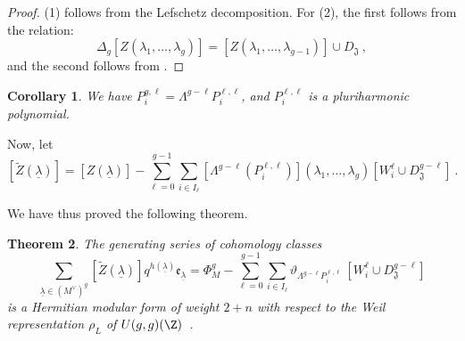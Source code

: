 \documentclass[11pt,letterpaper,english]{amsart}
\numberwithin{equation}{subsection}
\numberwithin{equation}{section}
\newcommand\cZ{{\mathcal Z}}
\newcommand\gram{{\mathrm{Gram}}}
\newcommand\fJ{{\mathfrak J}}
\theoremstyle{plain}
\newtheorem{theorem}{Theorem}[section]
\newtheorem{corollary}[theorem]{Corollary}
\theoremstyle{remark}
\begin{document}



\begin{proof}
    (1) follows from the Lefschetz decomposition. For (2), the first follows from the relation: 
    \[\Delta_g[Z(\lambda_1,\ldots,\lambda_g)]=[Z(\lambda_1,\ldots,\lambda_{g-1})]\cup D_\fJ~,\]
    and the second follows from .
\end{proof}
\begin{corollary}
    We have $P^{g,\ell}_i=\Lambda^{g-\ell}P^{\ell,\ell}_i$,
    and $P^{\ell,\ell}_i$ is a pluriharmonic polynomial.
\end{corollary}

Now, let \[[\widetilde{Z}(\underline \lambda)]=[Z(\underline\lambda)]-\sum_{\ell=0}^{g-1}\sum_{i\in I_{\ell}}[\Lambda^{g-\ell}(P_i^{\ell,\ell})](\lambda_1,\ldots,\lambda_g)[W_{i}^{\ell}\cup D_{\fJ}^{g-\ell}]~.\]


We have thus proved the following theorem.
\begin{theorem}\label{explicit-main-theorem}
    The generating series of cohomology classes
    \[\sum_{\underline \lambda\in (M^\vee)^g}[\widetilde{Z}(\underline\lambda)] q^{h(\underline{\lambda})}\mathfrak e_{\underline{\lambda}}=\Phi_M^g-\sum_{\ell=0}^{g-1}\sum_{i\in I_\ell}\vartheta_{\Lambda^{g-\ell}P^{\ell,\ell}_i}~[W^\ell_i\cup D_{\fJ}^{g-\ell}]\]
    is a Hermitian modular form of weight $2+n$ with respect to the Weil representation $\rho_L$ of $U(g,g)(\Z)$~.
\end{theorem}





\end{document}
